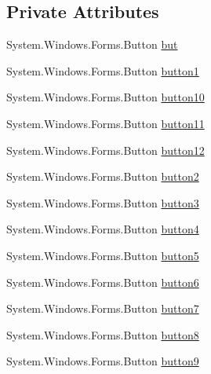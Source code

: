 \subsection*{Private Attributes}
\begin{DoxyCompactItemize}
\item 
System.\+Windows.\+Forms.\+Button \hyperlink{class__7___doroshenko__forms2__is52_1_1_win_container_a2b516032e496a3f233e89d24f4c6d996}{but}
\item 
System.\+Windows.\+Forms.\+Button \hyperlink{class__7___doroshenko__forms2__is52_1_1_win_container_abb0ebd6ded102971605fab47163cdfaa}{button1}
\item 
System.\+Windows.\+Forms.\+Button \hyperlink{class__7___doroshenko__forms2__is52_1_1_win_container_a7311e37184ae8f65d45fd1df03e34b39}{button10}
\item 
System.\+Windows.\+Forms.\+Button \hyperlink{class__7___doroshenko__forms2__is52_1_1_win_container_aac9b747c2e868975c6c5bceb40b07730}{button11}
\item 
System.\+Windows.\+Forms.\+Button \hyperlink{class__7___doroshenko__forms2__is52_1_1_win_container_a5853ecfcaf8c9bf508ead8574849a172}{button12}
\item 
System.\+Windows.\+Forms.\+Button \hyperlink{class__7___doroshenko__forms2__is52_1_1_win_container_a93e2d7f3878366c2f6b65028f67ff5f8}{button2}
\item 
System.\+Windows.\+Forms.\+Button \hyperlink{class__7___doroshenko__forms2__is52_1_1_win_container_afdba9e0786a0c814b5a37965c040dae8}{button3}
\item 
System.\+Windows.\+Forms.\+Button \hyperlink{class__7___doroshenko__forms2__is52_1_1_win_container_a37c84b11a570e447cca7084b9d9fd6f5}{button4}
\item 
System.\+Windows.\+Forms.\+Button \hyperlink{class__7___doroshenko__forms2__is52_1_1_win_container_aa47a1961f6ceacc594c6752dd15c484d}{button5}
\item 
System.\+Windows.\+Forms.\+Button \hyperlink{class__7___doroshenko__forms2__is52_1_1_win_container_aa9c99d160c6929aad25ef6996862387d}{button6}
\item 
System.\+Windows.\+Forms.\+Button \hyperlink{class__7___doroshenko__forms2__is52_1_1_win_container_a0ad5a947b25a85d65d201ce25e9105c7}{button7}
\item 
System.\+Windows.\+Forms.\+Button \hyperlink{class__7___doroshenko__forms2__is52_1_1_win_container_a7dd35facbbd984c019dbc0ad0dbb702e}{button8}
\item 
System.\+Windows.\+Forms.\+Button \hyperlink{class__7___doroshenko__forms2__is52_1_1_win_container_a0b128eade3e246faecdae470c505e738}{button9}

\end{DoxyCompactItemize}
